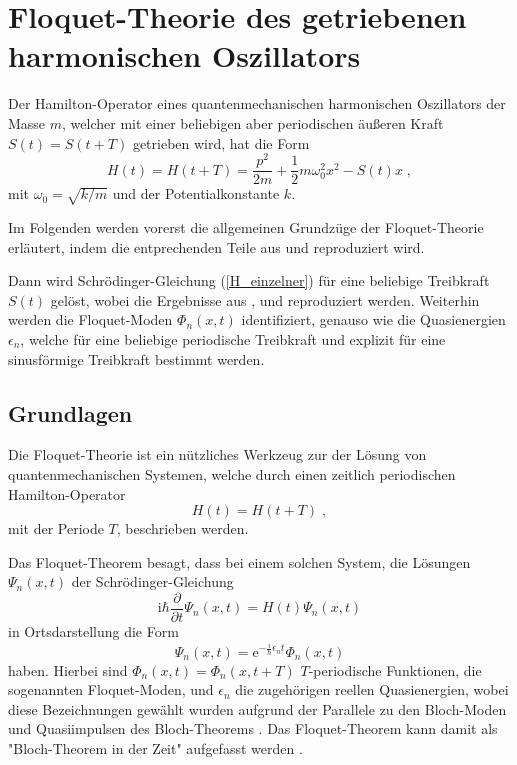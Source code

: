 \chapter{Floquet-Theorie des getriebenen harmonischen Oszillators}
Der Hamilton-Operator eines quantenmechanischen harmonischen Oszillators der Masse $m$, welcher mit einer beliebigen aber periodischen äußeren Kraft $S(t)=S(t+T)$ getrieben wird, hat die Form
\begin{equation}
  H(t) = H(t+T) = \frac{p^2}{2m} + \frac{1}{2}m\omega_0^2x^2-S(t)x \; ,
  \label{H_einzelner}
\end{equation}
mit $\omega_0=\sqrt{k/m}$ und der Potentialkonstante $k$.

Im Folgenden werden vorerst die allgemeinen Grundzüge der Floquet-Theorie erläutert, indem die entprechenden Teile aus \cite{haengi} und \cite{sherly} reproduziert wird.

Dann wird Schrödinger-Gleichung (\ref{H_einzelner}) für eine beliebige Treibkraft $S(t)$ gelöst, wobei die Ergebnisse aus \cite{haengi},\cite{husimi} und \cite{mads} reproduziert werden.
Weiterhin werden die Floquet-Moden $\Phi_n(x,t)$ identifiziert, genauso wie die Quasienergien $\epsilon_n$, welche für eine beliebige periodische Treibkraft und explizit für eine sinusförmige Treibkraft bestimmt werden.
\iffalse
Danach werden wir die Ewartungswerte $\braket{x}_n,\braket{x^2}_n,\braket{p}_n,\braket{p^2}_n$ und damit die Unschärfe berechnen, indem wir die bekannten Erwartungswerte des ungetriebenen Oszillators benutzen.
Ebenso werden wir den zeitabhängigen und gemittelten Erwartungswert der Energie $\braket{H}_n$ und $\bar H_n$ berechnen.
\fi

\section{Grundlagen}
  Die Floquet-Theorie \cite{haengi} ist ein nützliches Werkzeug zur der Lösung von quantenmechanischen Systemen, welche durch einen zeitlich periodischen Hamilton-Operator
  \begin{equation}
    H(t) = H(t+T) \; ,
  \end{equation}
  mit der Periode $T$, beschrieben werden.

  Das Floquet-Theorem besagt, dass bei einem solchen System, die Lösungen $\Psi_n(x,t)$ der Schrödinger-Gleichung
  \begin{equation}
    \text{i}\hbar\frac{\partial}{\partial t}\Psi_n(x,t) = H(t)\Psi_n(x,t)
    \label{schroedinger}
  \end{equation}
  in Ortsdarstellung die Form
  \begin{equation}
    \Psi_n(x,t) = \text{e}^{-\frac{i}{\hbar}\epsilon_nt}\Phi_n(x,t)
    \label{floquet_theorem}
  \end{equation}
  haben.
  Hierbei sind $\Phi_n(x,t) = \Phi_n(x,t+T)$ $T$-periodische Funktionen, die sogenannten Floquet-Moden, und $\epsilon_n$ die zugehörigen reellen Quasienergien, wobei diese Bezeichnungen gewählt wurden aufgrund der Parallele zu den Bloch-Moden und Quasiimpulsen des Bloch-Theorems \cite{haengi}.
  Das Floquet-Theorem kann damit als "Bloch-Theorem in der Zeit" aufgefasst werden \cite{sherly}.

